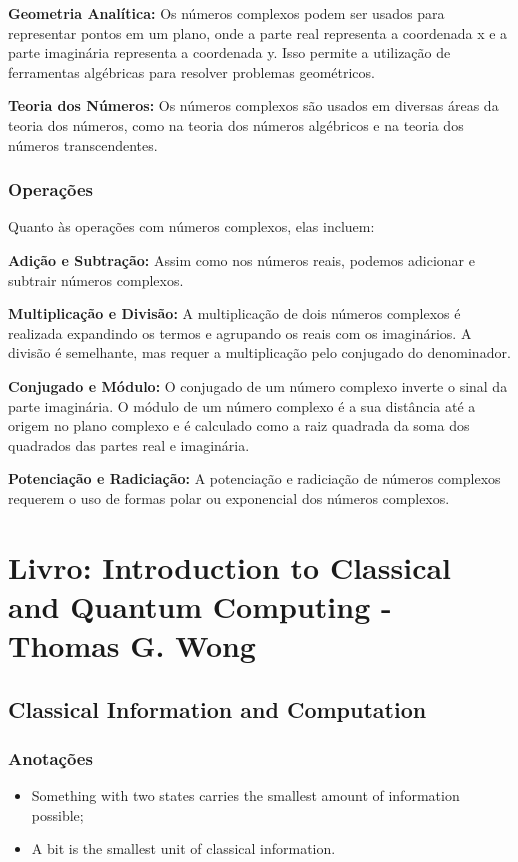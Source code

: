\documentclass[12pt]{article}
\begin{document}
\textbf{Geometria Analítica:} Os números complexos podem ser usados para representar pontos em um plano, onde a parte real representa a coordenada x e a parte imaginária representa a coordenada y. Isso permite a utilização de ferramentas algébricas para resolver problemas geométricos.

\textbf{Teoria dos Números:} Os números complexos são usados em diversas áreas da teoria dos números, como na teoria dos números algébricos e na teoria dos números transcendentes.

\subsubsection{Operações}

Quanto às operações com números complexos, elas incluem:

\textbf{Adição e Subtração:} Assim como nos números reais, podemos adicionar e subtrair números complexos.

\textbf{Multiplicação e Divisão:} A multiplicação de dois números complexos é realizada expandindo os termos e agrupando os reais com os imaginários. A divisão é semelhante, mas requer a multiplicação pelo conjugado do denominador.

\textbf{Conjugado e Módulo:} O conjugado de um número complexo inverte o sinal da parte imaginária. O módulo de um número complexo é a sua distância até a origem no plano complexo e é calculado como a raiz quadrada da soma dos quadrados das partes real e imaginária.

\textbf{Potenciação e Radiciação:} A potenciação e radiciação de números complexos requerem o uso de formas polar ou exponencial dos números complexos.

\section{Livro: Introduction to Classical and Quantum Computing - Thomas G. Wong}

\subsection{Classical Information and Computation}

\subsubsection{Anotações}

\begin{itemize}
	\item Something with two states carries the smallest amount of information possible;
	\item A bit is the smallest unit of classical information.
\end{itemize}
\end{document}
